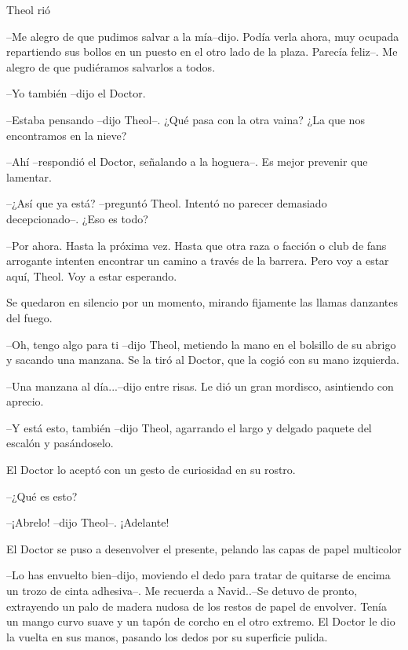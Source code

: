 Theol rió 

--Me alegro de que pudimos salvar a la mía--dijo. Podía verla ahora, muy ocupada repartiendo sus bollos en un puesto en el otro lado de la plaza. Parecía feliz--. Me alegro de que pudiéramos salvarlos a todos.



--Yo también --dijo el Doctor.



--Estaba pensando --dijo Theol--. ¿Qué pasa con la otra vaina? ¿La que nos encontramos en la nieve?



--Ahí --respondió el Doctor, señalando a la hoguera--. Es mejor prevenir que lamentar.



--¿Así que ya está? --preguntó Theol. Intentó no parecer demasiado decepcionado--. ¿Eso es todo?



--Por ahora. Hasta la próxima vez. Hasta que otra raza o facción o club de fans arrogante intenten encontrar un camino a través de la barrera. Pero voy a estar aquí, Theol. Voy a estar esperando.



Se quedaron en silencio por un momento, mirando fijamente las llamas danzantes del fuego.



--Oh, tengo algo para ti --dijo Theol, metiendo la mano en el bolsillo de su abrigo y sacando una manzana. Se la tiró al Doctor, que la cogió con su mano izquierda.



--Una manzana al día...--dijo entre risas. Le dió un gran mordisco, asintiendo con aprecio.



--Y está esto, también --dijo Theol, agarrando el largo y delgado paquete del escalón y pasándoselo.



El Doctor lo aceptó con un gesto de curiosidad en su rostro. 

--¿Qué es esto?



--¡Abrelo! --dijo Theol--. ¡Adelante!



El Doctor se puso a desenvolver el presente, pelando las capas de papel multicolor 

--Lo has envuelto bien--dijo, moviendo el dedo para tratar de quitarse de encima un trozo de cinta adhesiva--. Me recuerda a Navid..--Se detuvo de pronto, extrayendo un palo de madera nudosa de los restos de papel de envolver. Tenía un mango curvo suave y un tapón de corcho en el otro extremo. El Doctor le dio la vuelta en sus manos, pasando los dedos por su superficie pulida.



